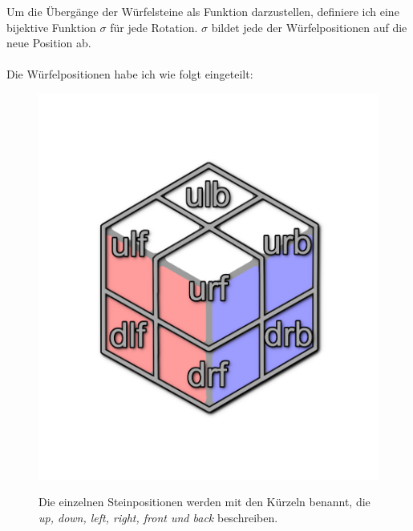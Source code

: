 \documentclass[12pt,a4paper, usenames, dvipsnames]{article}
\begin{document}
Um die Übergänge der Würfelsteine als Funktion darzustellen, definiere ich eine bijektive Funktion $\sigma$ für jede Rotation. $\sigma$ bildet jede der Würfelpositionen auf die neue Position ab. \\
\\
Die Würfelpositionen habe ich wie folgt eingeteilt: \\
\begin{figure}[H]
\centering
\includegraphics[scale=0.15]{caged_positions.png} \\
\caption{Die einzelnen Steinpositionen werden mit den Kürzeln benannt, die \textit{up, down, left, right, front und back} beschreiben.}
\end{figure}
\end{document}
